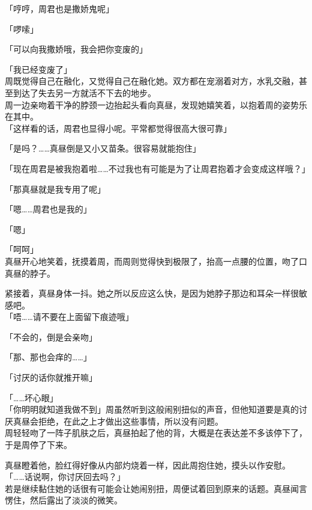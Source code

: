 「哼哼，周君也是撒娇鬼呢」

「啰嗦」

「可以向我撒娇哦，我会把你变废的」

「我已经变废了」\\

周既觉得自己在融化，又觉得自己在融化她。双方都在宠溺着对方，水乳交融，甚至到达了失去另一方就活不下去的地步。\\

周一边亲吻着干净的脖颈一边抬起头看向真昼，发现她嬉笑着，以抱着周的姿势乐在其中。\\

「这样看的话，周君也显得小呢。平常都觉得很高大很可靠」

「是吗？……真昼倒是又小又苗条。很容易就能抱住」

「现在周君是被我抱着啦……不过我也有可能是为了让周君抱着才会变成这样哦？」

「那真昼就是我专用了呢」

「嗯……周君也是我的」

「嗯」

「呵呵」\\

真昼开心地笑着，抚摸着周，而周则觉得快到极限了，抬高一点腰的位置，吻了口真昼的脖子。

紧接着，真昼身体一抖。她之所以反应这么快，是因为她脖子那边和耳朵一样很敏感吧。\\

「唔……请不要在上面留下痕迹哦」

「不会的，倒是会亲吻」

「那、那也会痒的……」

「讨厌的话你就推开嘛」

「……坏心眼」\\

「你明明就知道我做不到」周虽然听到这般闹别扭似的声音，但他知道要是真的讨厌真昼会拒绝，在此之上才做出这些事情，所以没有问题。\\

周轻轻吻了一阵子肌肤之后，真昼拍起了他的背，大概是在表达差不多该停下了，于是周停了下来。

真昼瞪着他，脸红得好像从内部灼烧着一样，因此周抱住她，摸头以作安慰。\\

「……话说啊，你讨厌回去吗？」\\

若是继续黏住她的话很有可能会让她闹别扭，周便试着回到原来的话题。真昼闻言愣住，然后露出了淡淡的微笑。\\


